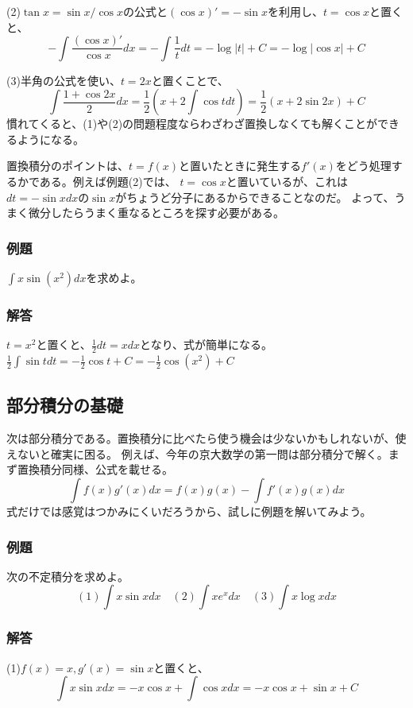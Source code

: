 \documentclass[a4j,dvipdfmx]{jsarticle}
\begin{document}
(2)$\tan x=\sin x/\cos x$の公式と$(\cos x)'=-\sin x$を利用し、$t=\cos x$と置くと、
\begin{equation*}
    -\int \frac{(\cos x)'}{\cos x}dx=-\int \frac{1}{t}dt=-\log |t|+C=-\log|\cos x|+C
\end{equation*}

(3)半角の公式を使い、$t=2x$と置くことで、
\begin{equation*}
    \int \frac{1+\cos 2x}{2}dx=\frac{1}{2}(x+2\int \cos tdt)=\frac{1}{2}(x+2\sin 2x)+C
\end{equation*}
慣れてくると、(1)や(2)の問題程度ならわざわざ置換しなくても解くことができるようになる。

置換積分のポイントは、$t=f(x)$と置いたときに発生する$f'(x)$をどう処理するかである。例えば例題(2)では、
$t=\cos x$と置いているが、これは$dt=-\sin x dx$の$\sin x$がちょうど分子にあるからできることなのだ。
よって、うまく微分したらうまく重なるところを探す必要がある。
\subsubsection{例題}
$\displaystyle \int x\sin(x^2)dx$を求めよ。
\subsubsection*{解答}
$t=x^2$と置くと、$\frac{1}{2}dt=xdx$となり、式が簡単になる。
$\displaystyle \frac{1}{2}\int \sin tdt=-\frac{1}{2}\cos t+C=-\frac{1}{2}\cos (x^2)+C$
\newpage
\subsection{部分積分の基礎}
次は部分積分である。置換積分に比べたら使う機会は少ないかもしれないが、使えないと確実に困る。
例えば、今年の京大数学の第一問は部分積分で解く。まず置換積分同様、公式を載せる。
\begin{equation*}
    \int f(x)g'(x)dx=f(x)g(x)-\int f'(x)g(x)dx
\end{equation*}
式だけでは感覚はつかみにくいだろうから、試しに例題を解いてみよう。
\subsubsection{例題}
次の不定積分を求めよ。
\begin{equation*}
    (1)\int x\sin xdx\quad (2)\int xe^x dx \quad (3)\int x\log x dx
\end{equation*}
\subsubsection*{解答}
(1)$f(x)=x,g'(x)=\sin x$と置くと、
\begin{equation*}
    \int x\sin x dx=-x\cos x+\int \cos xdx=-x\cos x+\sin x+C 
\end{equation*}
\end{document}
